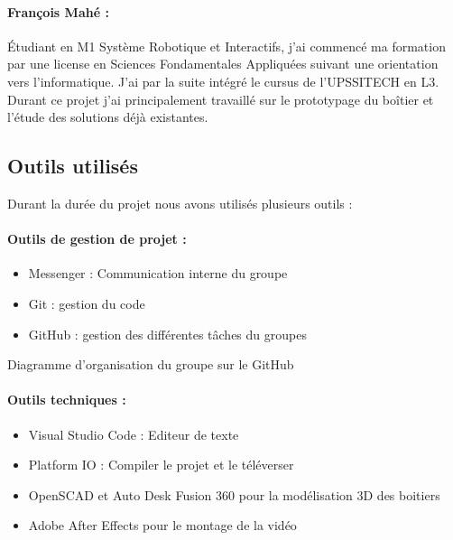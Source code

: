 \paragraph{François Mahé :}
Étudiant en M1 Système Robotique et Interactifs, j’ai commencé ma formation par une license en Sciences Fondamentales Appliquées suivant une orientation vers l’informatique. J’ai par la suite intégré le cursus de l’UPSSITECH en L3. Durant ce projet j’ai principalement travaillé sur le prototypage du boîtier et l’étude des solutions déjà existantes.

\subsection{Outils utilisés}
Durant la durée du projet nous avons utilisés plusieurs outils :

\paragraph{Outils de gestion de projet :}
\begin{itemize}
    \item Messenger : Communication interne du groupe
    \item Git : gestion du code
    \item GitHub : gestion des différentes tâches du groupes
\end{itemize}

\begin{center}
  
  Diagramme d'organisation du groupe sur le GitHub
\end{center}

\paragraph{Outils techniques :}
\begin{itemize}
    \item Visual Studio Code : Editeur de texte
    \item Platform IO : Compiler le projet et le téléverser
    \item OpenSCAD et Auto Desk Fusion 360 pour la modélisation 3D des boitiers
    \item Adobe After Effects pour le montage de la vidéo
\end{itemize}
